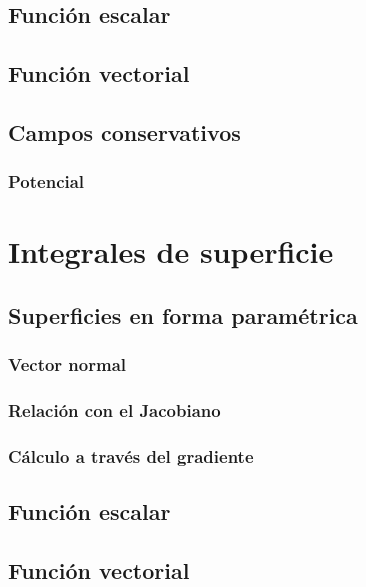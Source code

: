 \documentclass[12pt, fleqn]{report}                             %
\begin{document}
			\subsection{Función escalar}
			
			\subsection{Función vectorial}
			
			\subsection{Campos conservativos}
			
				\subsubsection{Potencial}
		
		\section{Integrales de superficie}
		
			\subsection{Superficies en forma paramétrica}
			
				\subsubsection{Vector normal}
			
				\subsubsection{Relación con el Jacobiano}
				
				\subsubsection{Cálculo a través del gradiente}
			
			\subsection{Función escalar}
			
			\subsection{Función vectorial}
		
\end{document}
